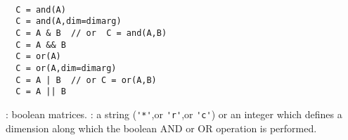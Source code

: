 \begin{mandesc}
  \\
\end{mandesc}

\begin{calling_sequence}
\begin{verbatim}
  C = and(A)
  C = and(A,dim=dimarg)
  C = A & B  // or  C = and(A,B)
  C = A && B 
  C = or(A)
  C = or(A,dim=dimarg)
  C = A | B  // or C = or(A,B)
  C = A || B 
\end{verbatim}
\end{calling_sequence}
\begin{parameters}
  \begin{varlist}
    : boolean matrices. 
    : a string (\verb!'*'!,or \verb!'r'!,or \verb!'c'!) or an integer which defines 
    a dimension along which the boolean AND or OR operation is performed. 
  \end{varlist}
\end{parameters}

